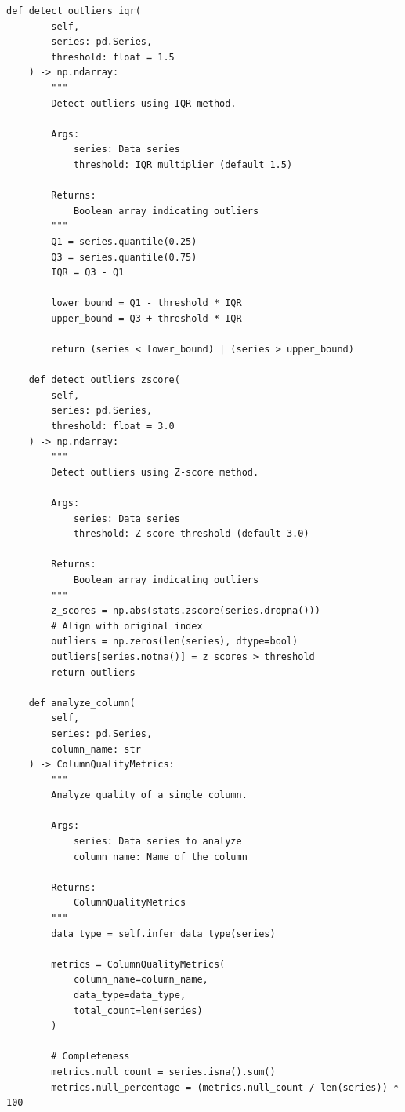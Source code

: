 \begin{lstlisting}[style=python, caption={Data quality metrics with statistical validation}]
    def detect_outliers_iqr(
        self,
        series: pd.Series,
        threshold: float = 1.5
    ) -> np.ndarray:
        """
        Detect outliers using IQR method.

        Args:
            series: Data series
            threshold: IQR multiplier (default 1.5)

        Returns:
            Boolean array indicating outliers
        """
        Q1 = series.quantile(0.25)
        Q3 = series.quantile(0.75)
        IQR = Q3 - Q1

        lower_bound = Q1 - threshold * IQR
        upper_bound = Q3 + threshold * IQR

        return (series < lower_bound) | (series > upper_bound)

    def detect_outliers_zscore(
        self,
        series: pd.Series,
        threshold: float = 3.0
    ) -> np.ndarray:
        """
        Detect outliers using Z-score method.

        Args:
            series: Data series
            threshold: Z-score threshold (default 3.0)

        Returns:
            Boolean array indicating outliers
        """
        z_scores = np.abs(stats.zscore(series.dropna()))
        # Align with original index
        outliers = np.zeros(len(series), dtype=bool)
        outliers[series.notna()] = z_scores > threshold
        return outliers

    def analyze_column(
        self,
        series: pd.Series,
        column_name: str
    ) -> ColumnQualityMetrics:
        """
        Analyze quality of a single column.

        Args:
            series: Data series to analyze
            column_name: Name of the column

        Returns:
            ColumnQualityMetrics
        """
        data_type = self.infer_data_type(series)

        metrics = ColumnQualityMetrics(
            column_name=column_name,
            data_type=data_type,
            total_count=len(series)
        )

        # Completeness
        metrics.null_count = series.isna().sum()
        metrics.null_percentage = (metrics.null_count / len(series)) * 100


\end{lstlisting}
